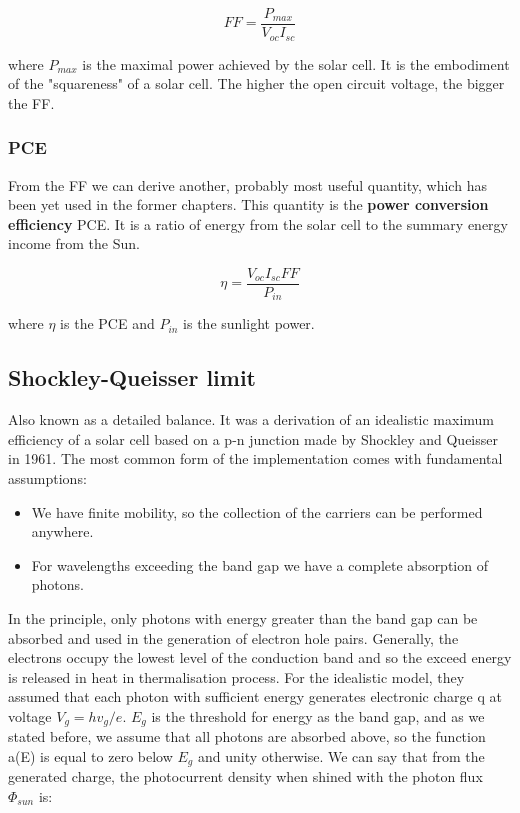 \begin{equation}
FF = \frac{P_{max}}{V_{oc}I_{sc}}
\end{equation}

where $P_{max}$ is the maximal power achieved by the solar cell. It is the   embodiment of the "squareness" of a solar cell. The higher the open circuit voltage, the bigger the FF. 

\subsubsection{PCE}

From the FF we can derive another, probably most useful quantity, which has been yet used in the former chapters. This quantity is the \textbf{power conversion efficiency} PCE. It is a ratio of energy from the solar cell to the summary energy income from the Sun. 

\begin{equation}
\eta = \frac{V_{oc}I_{sc}FF}{P_{in}}
\end{equation}

where $\eta$ is the PCE and $P_{in}$ is the sunlight power. 

\subsection{Shockley-Queisser limit}

Also known as a detailed balance. It was a derivation of an idealistic maximum efficiency of a solar cell based on a p-n junction made by Shockley and Queisser in 1961\cite{limit}. The most common form of the implementation comes with fundamental assumptions:

\begin{itemize}
\item We have finite mobility, so the collection of the carriers can be performed anywhere.
\item For wavelengths exceeding the band gap we have a complete absorption of photons.
\end{itemize}


In the principle, only photons with energy greater than the band gap can be absorbed and used in the generation of electron hole pairs. Generally, the electrons occupy the lowest level of the conduction band and so the exceed energy is released in heat in thermalisation process. For the idealistic model, they assumed that each photon with sufficient energy generates electronic charge q at voltage $V_g=hv_g/e$. $E_g$ is the threshold for energy as the band gap, and as we stated before, we assume that all photons are absorbed above, so the function a(E) is equal to zero below $E_g$ and unity otherwise. We can say that from the generated charge, the photocurrent density when shined with the photon flux $\Phi _{sun}$ is:

